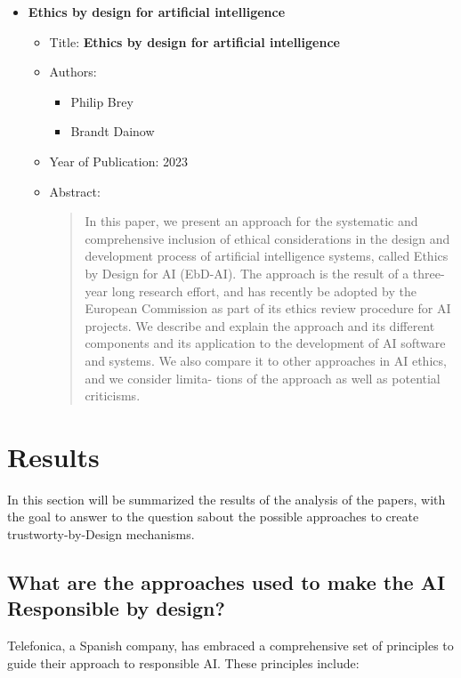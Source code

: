 \documentclass{article}
\begin{document}
\begin{itemize}
        \item \textbf{Ethics by design for artificial intelligence}
        \begin{itemize}
            \item Title: \textbf{Ethics by design for artificial intelligence}
            \item Authors:
            \begin{itemize}
                \item Philip Brey
                \item Brandt Dainow
            \end{itemize}
            \item Year of Publication: 2023
            \item Abstract:
            \begin{abstract}
                In this paper, we present an approach for the systematic and comprehensive inclusion of ethical considerations in the design 
                and development process of artificial intelligence systems, called Ethics by Design for AI (EbD-AI). The approach is the 
                result of a three-year long research effort, and has recently be adopted by the European Commission as part of its ethics 
                review procedure for AI projects. We describe and explain the approach and its different components and its application to 
                the development of AI software and systems. We also compare it to other approaches in AI ethics, and we consider limita-
                tions of the approach as well as potential criticisms.
            \end{abstract}
        \end{itemize}
    \end{itemize}
    

\newpage
\section{Results}
In this section will be summarized the results of the analysis of the papers, with the goal to answer to the question sabout the possible approaches to create trustworty-by-Design mechanisms.

\subsection{What are the approaches used to make the AI Responsible by design?}
Telefonica\cite{DBLP:journals/corr/abs-1909-12838}, a Spanish company, has embraced a comprehensive set of principles to guide their approach to responsible AI. These principles include:
\end{document}
